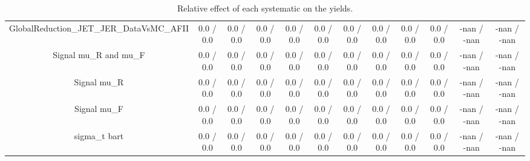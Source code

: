 \begin{table}[htbp]
\begin{center}
\begin{tabular}{|c|c|c|c|c|c|c|c|c|c|c|c|}
  GlobalReduction_JET_JER_DataVsMC_AFII & 0.0 / 0.0 & 0.0 / 0.0 & 0.0 / 0.0 & 0.0 / 0.0 & 0.0 / 0.0 & 0.0 / 0.0 & 0.0 / 0.0 & 0.0 / 0.0 & 0.0 / 0.0 & -nan / -nan & -nan / -nan \\ 
  Signal  mu_{R} and  mu_{F} & 0.0 / 0.0 & 0.0 / 0.0 & 0.0 / 0.0 & 0.0 / 0.0 & 0.0 / 0.0 & 0.0 / 0.0 & 0.0 / 0.0 & 0.0 / 0.0 & 0.0 / 0.0 & -nan / -nan & -nan / -nan \\ 
  Signal  mu_{R} & 0.0 / 0.0 & 0.0 / 0.0 & 0.0 / 0.0 & 0.0 / 0.0 & 0.0 / 0.0 & 0.0 / 0.0 & 0.0 / 0.0 & 0.0 / 0.0 & 0.0 / 0.0 & -nan / -nan & -nan / -nan \\ 
  Signal  mu_{F} & 0.0 / 0.0 & 0.0 / 0.0 & 0.0 / 0.0 & 0.0 / 0.0 & 0.0 / 0.0 & 0.0 / 0.0 & 0.0 / 0.0 & 0.0 / 0.0 & 0.0 / 0.0 & -nan / -nan & -nan / -nan \\ 
   sigma_{t bar{t}} & 0.0 / 0.0 & 0.0 / 0.0 & 0.0 / 0.0 & 0.0 / 0.0 & 0.0 / 0.0 & 0.0 / 0.0 & 0.0 / 0.0 & 0.0 / 0.0 & 0.0 / 0.0 & -nan / -nan & -nan / -nan \\ 
\hline 
\end{tabular} 
\caption{Relative effect of each systematic on the yields.} 
\end{center} 
\end{table} 
